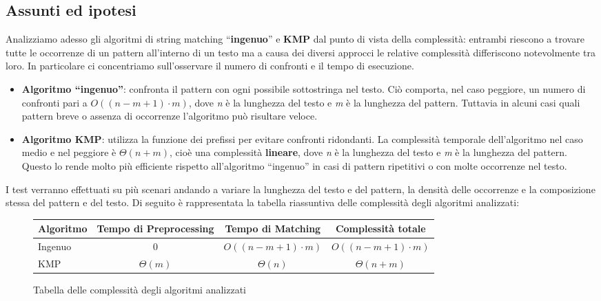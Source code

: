 \documentclass{article}
\begin{document}
\subsection{Assunti ed ipotesi}
Analizziamo adesso gli algoritmi di string matching ``\textbf{ingenuo}'' e \textbf{KMP} dal punto di vista della complessità: entrambi riescono a trovare tutte le occorrenze di un pattern all'interno di un testo ma a causa dei diversi approcci le relative complessità differiscono notevolmente tra loro. In particolare ci concentriamo sull'osservare il numero di confronti e il tempo di esecuzione.
\begin{itemize}
    \item \textbf{Algoritmo ``ingenuo''}: confronta il pattern con ogni possibile sottostringa nel testo. Ciò comporta, nel caso peggiore, un numero di confronti pari a $O((n - m + 1) \cdot m)$, dove \textit{n} è la lunghezza del testo e \textit{m} è la lunghezza del pattern. Tuttavia in alcuni casi quali pattern breve o assenza di occorrenze l'algoritmo può risultare veloce.
    \item \textbf{Algoritmo KMP}: utilizza la funzione dei prefissi per evitare confronti ridondanti. La complessità temporale dell'algoritmo nel caso medio e nel peggiore è $\Theta(n + m)$, cioè una complessità \textbf{lineare}, dove \textit{n} è la lunghezza del testo e \textit{m} è la lunghezza del pattern. Questo lo rende molto più efficiente rispetto all'algoritmo ``ingenuo'' in casi di pattern ripetitivi o con molte occorrenze nel testo.
\end{itemize}
I test verranno effettuati su più scenari andando a variare la lunghezza del testo e del pattern, la densità delle occorrenze e la composizione stessa del pattern e del testo.
\newpage
\noindent Di seguito è rappresentata la tabella riassuntiva delle complessità degli algoritmi analizzati:
\begin{figure}[H]
    \begin{table}[H]
        \centering
        \begin{tabular}{>{\raggedright\arraybackslash}p{2cm}ccc}
            Algoritmo & Tempo di Preprocessing & Tempo di Matching        & Complessità totale       \\
            \midrule
            Ingenuo   & 0                      & $O((n - m + 1) \cdot m)$ & $O((n - m + 1) \cdot m)$ \\
            KMP       & $\Theta(m)$            & $\Theta(n)$              & $\Theta(n + m)$          \\
        \end{tabular}
    \end{table}
    \caption{Tabella delle complessità degli algoritmi analizzati}
    \label{tab:complexity-table}
\end{figure}
\end{document}

